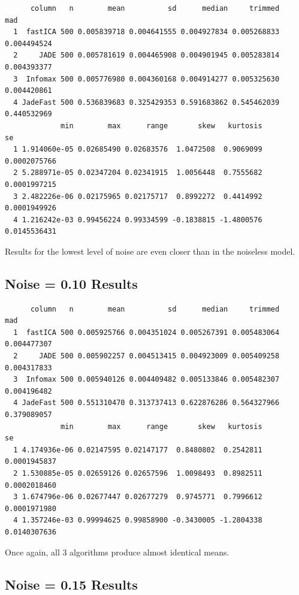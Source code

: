 \documentclass[12pt,twoside]{amherstthesis}
\begin{document}
  \begin{verbatim}
      column   n        mean          sd      median     trimmed         mad
  1  fastICA 500 0.005839718 0.004641555 0.004927834 0.005268833 0.004494524
  2     JADE 500 0.005781619 0.004465908 0.004901945 0.005283814 0.004393377
  3  Infomax 500 0.005776980 0.004360168 0.004914277 0.005325630 0.004420861
  4 JadeFast 500 0.536839683 0.325429353 0.591683862 0.545462039 0.440532969
             min        max      range       skew   kurtosis           se
  1 1.914060e-05 0.02685490 0.02683576  1.0472508  0.9069099 0.0002075766
  2 5.288971e-05 0.02347204 0.02341915  1.0056448  0.7555682 0.0001997215
  3 2.482226e-06 0.02175965 0.02175717  0.8992272  0.4414992 0.0001949926
  4 1.216242e-03 0.99456224 0.99334599 -0.1838815 -1.4800576 0.0145536431
  \end{verbatim}
  
  Results for the lowest level of noise are even closer than in the
  noiseless model.
  
  \subsection{Noise = 0.10 Results}\label{noise-0.10-results-1}
  
  \begin{verbatim}
      column   n        mean          sd      median     trimmed         mad
  1  fastICA 500 0.005925766 0.004351024 0.005267391 0.005483064 0.004477307
  2     JADE 500 0.005902257 0.004513415 0.004923009 0.005409258 0.004317833
  3  Infomax 500 0.005940126 0.004409482 0.005133846 0.005482307 0.004196482
  4 JadeFast 500 0.551310470 0.313737413 0.622876286 0.564327966 0.379089057
             min        max      range       skew   kurtosis           se
  1 4.174936e-06 0.02147595 0.02147177  0.8480802  0.2542811 0.0001945837
  2 1.530885e-05 0.02659126 0.02657596  1.0098493  0.8982511 0.0002018460
  3 1.674796e-06 0.02677447 0.02677279  0.9745771  0.7996612 0.0001971980
  4 1.357246e-03 0.99994625 0.99858900 -0.3430005 -1.2804338 0.0140307636
  \end{verbatim}
  
  Once again, all 3 algorithms produce almost identical means.
  
  \subsection{Noise = 0.15 Results}\label{noise-0.15-results-1}
  
\end{document}
